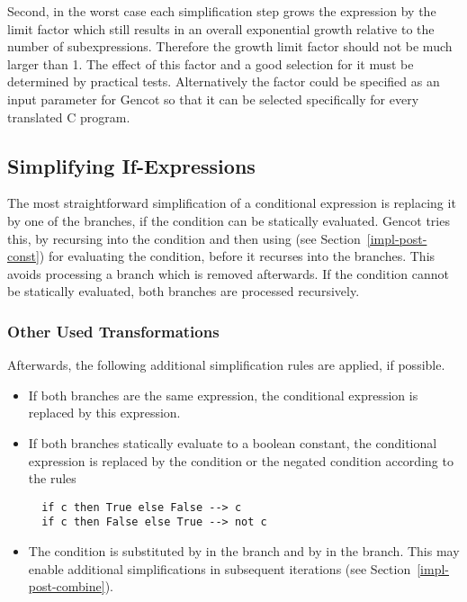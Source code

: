 Second, in the worst case each simplification step grows the expression by the limit factor which still results in an overall exponential growth
relative to the number of subexpressions. Therefore the growth limit factor should not be much larger than 1. The effect of this
factor and a good selection for it must be determined by practical tests. Alternatively the factor could be specified as an input 
parameter for Gencot so that it can be selected specifically for every translated C program.

\subsection{Simplifying If-Expressions}
\label{impl-post-if}

The most straightforward simplification of a conditional expression is replacing it by one of the branches, if the condition can be
statically evaluated. Gencot tries this, by recursing into the condition and then using  (see Section~\ref{impl-post-const})
for evaluating the condition, before it recurses into the branches. This avoids processing a branch which is removed afterwards. 
If the condition cannot be statically evaluated, both branches are processed recursively.

\subsubsection{Other Used Transformations}

Afterwards, the following additional simplification rules are applied, if possible.
\begin{itemize}
\item If both branches are the same expression, the conditional expression is replaced by this expression.
\item If both branches statically evaluate to a boolean constant, the conditional expression is replaced
by the condition or the negated condition according to the rules
\begin{verbatim}
  if c then True else False --> c
  if c then False else True --> not c
\end{verbatim}
\item The condition is substituted by  in the  branch and by  in the  branch. This 
may enable additional simplifications in subsequent iterations (see Section~\ref{impl-post-combine}).
\end{itemize}

